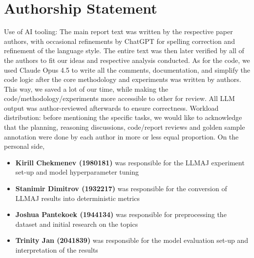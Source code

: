 \documentclass[11pt]{article}
\begin{document}
\newpage
\section*{Authorship Statement}
Use of AI tooling: The main report text was written by the respective paper authors, with occasional refinements by ChatGPT for spelling correction and refinement of the language style. The entire text was then later verified by all of the authors to fit our ideas and respective analysis conducted. As for the code, we used Claude Opus 4.5 to write all the comments, documentation, and simplify the code logic after the core methodology and experiments was written by authors. This way, we saved a lot of our time, while making the code/methodology/experiments more accessible to other for review. All LLM output was author-reviewed afterwards to ensure correctness.
Workload distribution: before mentioning the specific tasks, we would like to acknowledge that the planning, reasoning discussions, code/report reviews and golden sample annotation were done by each author in more or less equal proportion. On the personal side,
\begin{itemize}
    \item \textbf{Kirill Chekmenev (1980181)} was responsible for the LLMAJ experiment set-up and model hyperparameter tuning
    \item \textbf{Stanimir Dimitrov (1932217)} was responsible for the conversion of LLMAJ results into deterministic metrics
    \item \textbf{Joshua Pantekoek (1944134)} was responsible for preprocessing the dataset and initial research on the topics
    \item \textbf{Trinity Jan (2041839)} was responsible for the model evaluation set-up and interpretation of the results
\end{itemize}


\end{document}
